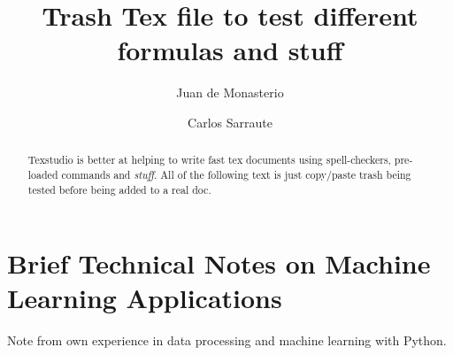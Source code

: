 \documentclass{article}%
\newcommand{\Expect}{{\mathbb{E}}}
\newtheorem{definition}{Definition}[subsection]
\theoremstyle{definition}
\begin{document}
\title{Trash Tex file to test different formulas and stuff}




\author{
	Juan de Monasterio
	\and Carlos Sarraute
}

%
%


\maketitle
\begin{abstract}
	
	Texstudio is better at helping to write fast tex documents using spell-checkers, pre-loaded commands and \textit{stuff}. All of the following text is just copy/paste trash being tested before being added to a real doc.
	



\end{abstract} 

\section{Brief Technical Notes on Machine Learning Applications}\label{section-technicalObservations}
Note from own experience  in data processing and machine learning with Python.
\end{document}
